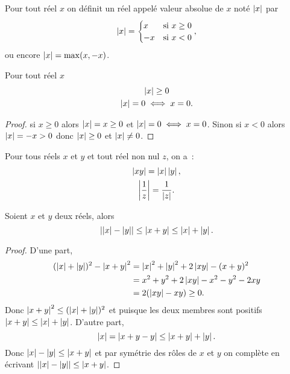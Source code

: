 \begin{defdef}
  Pour tout réel $x$ on définit un réel appelé valeur absolue de $x$ noté $\abs{x}$ par
  \begin{equation}
    \abs{x}=\begin{cases} x & \text{si } x\geq 0 \\ -x & \text{si } x<0\end{cases},
  \end{equation}
ou encore $\abs{x}=\max(x,-x)$.
\end{defdef}
\begin{prop}
  Pour tout réel $x$
  \begin{gather}
    \abs{x}\geq 0 \\
    \abs{x}=0 \iff x=0.
  \end{gather}
\end{prop}
\begin{proof}
  si $x\geq 0$ alors $\abs{x}=x\geq 0$ et $\abs{x}=0 \iff x=0$. Sinon si $x<0$ alors $\abs{x}=-x>0$ donc $\abs{x}\geq 0$ et $\abs{x}\neq 0$.
\end{proof}
\begin{prop}
  Pour tous réels $x$ et $y$ et tout réel non nul $z$, on a~:
  \begin{gather}
    \abs{xy}=\abs{x}\abs{y}, \\ 
    \abs{\frac{1}{z}}=\frac{1}{\abs{z}}.
  \end{gather}
\end{prop}
\begin{prop}
  Soient $x$ et $y$ deux réels, alors
  \begin{equation}
    \abs{\abs{x}-\abs{y}}\leq \abs{x+y} \leq \abs{x}+\abs{y}.
  \end{equation}
\end{prop}
\begin{proof}
  D'une part,
  \begin{align}
    (\abs{x}+\abs{y})^2-\abs{x+y}^2 &=\abs{x}^2+\abs{y}^2+2\abs{xy}-(x+y)^2\\
    &=x^2+y^2+2\abs{xy}-x^2-y^2-2xy\\
    &=2(\abs{xy}-xy)\geq 0.
  \end{align}
Donc $\abs{x+y}^2\leq (\abs{x}+\abs{y})^2$ et puisque les deux membres sont positifs $\abs{x+y}\leq \abs{x}+\abs{y}$. D'autre part,
\begin{equation}
  \abs{x}=\abs{x+y-y}\leq \abs{x+y}+\abs{y}.
\end{equation}
Donc $\abs{x}-\abs{y}\leq \abs{x+y}$ et par symétrie des rôles de $x$ et $y$ on complète en écrivant $\abs{\abs{x}-\abs{y}}\leq \abs{x+y}$.
\end{proof}
